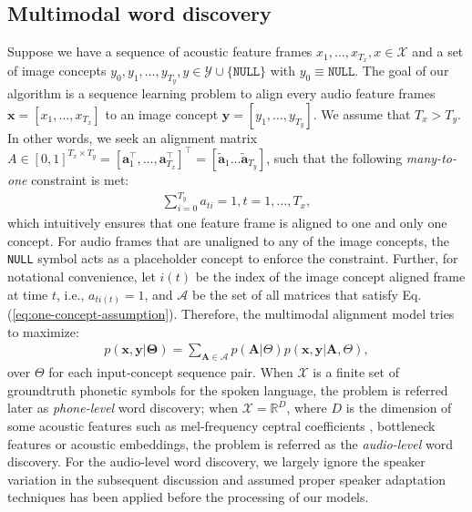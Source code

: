 \documentclass[journal]{IEEEtran}
\newcommand{\reals}{\mathbb R}
\begin{document}
\subsection{Multimodal word discovery}
Suppose we have a sequence of acoustic feature frames $x_1, \ldots, x_{T_x}, x \in \mathcal X$ and a set of image concepts $y_0, y_1, \ldots, y_{T_y}, y \in \mathcal Y \cup \{\texttt{NULL}\}$ with $y_0 \equiv \texttt{NULL}$. The goal of our algorithm is a sequence learning problem to align every audio feature frames $\mathbf x = [x_1, \ldots, x_{T_x}]$ to an image concept $\mathbf y = [y_1, \ldots, y_{T_y}]$.  We assume that $T_x > T_y$. In other words, we seek an alignment matrix $A \in [0, 1]^{T_x \times T_y}=[\mathbf a_1^\top, \ldots, \mathbf a_{T_x}^{\top}]^{\top} = [\tilde{\mathbf a}_1 \ldots \tilde{\mathbf a}_{T_y}]$, such that the following \textit{many-to-one} constraint is met:
\begin{align}\label{eq:one-concept-assumption}
    \sum_{i=0}^{T_y} a_{ti} = 1, t = 1, \ldots, T_x,
\end{align}
which intuitively ensures that one feature frame is aligned to one and only one concept. For audio frames that are unaligned to any of the image concepts, the \texttt{NULL} symbol acts as a placeholder concept to enforce the constraint. Further, for notational convenience, let $i(t)$ be the index of the image concept aligned frame at time $t$, i.e., $a_{ti(t)} = 1$, and $\mathcal A$ be the set of all matrices that satisfy Eq. (\ref{eq:one-concept-assumption}). Therefore, the multimodal alignment model tries to maximize:
\begin{align}\label{eq:general_trans_prob}
    p(\mathbf{x},\mathbf{y}|\mathbf \Theta) = \sum_{\mathbf{A}\in \mathcal A} p(\mathbf{A}|\Theta) p(\mathbf{x}, \mathbf{y}|\mathbf{A}, \Theta),
\end{align}
over $\Theta$ for each input-concept sequence pair. When $\mathcal X$ is a finite set of groundtruth phonetic symbols for the spoken language, the problem is referred later as \textit{phone-level} word discovery; when $\mathcal X = \reals^{D}$, where $D$ is the dimension of some acoustic features such as mel-frequency ceptral coefficients \cite{Davis1980}, bottleneck features \cite{Roweis1997, Fer2017} or acoustic embeddings, the problem is referred as the \textit{audio-level} word discovery. For the audio-level word discovery, we largely ignore the speaker variation in the subsequent discussion and assumed proper speaker adaptation techniques has been applied before the processing of our models.
\end{document}
